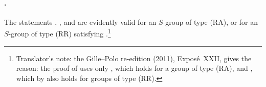\paragraph{.}
The statements , , and  are evidently valid for an \(S\)-group
of type \textup{(RA)}, or for an \(S\)-group of type \textup{(RR)}
satisfying .\footnote{Translator's note: the Gille--Polo re-edition (2011), Exposé~XXII, gives the reason:
the proof of  uses only , which holds for a group of type
\textup{(RA)}, and , which by  also holds
for groups of type \textup{(RR)}.}

